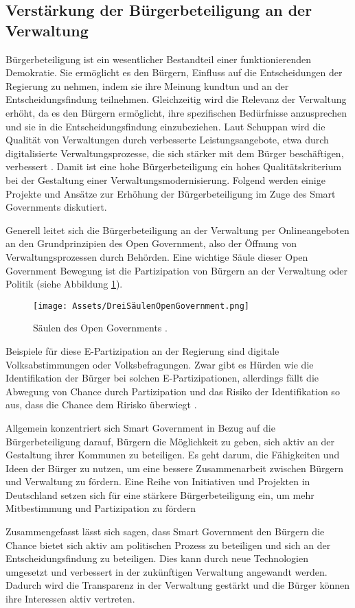 \subsection{Verstärkung der Bürgerbeteiligung an der Verwaltung}
Bürgerbeteiligung ist ein wesentlicher Bestandteil einer funktionierenden Demokratie. 
Sie ermöglicht es den Bürgern, Einfluss auf die Entscheidungen der Regierung zu nehmen, indem sie ihre Meinung kundtun und an der Entscheidungsfindung teilnehmen.
Gleichzeitig wird die Relevanz der Verwaltung erhöht, da es den Bürgern ermöglicht, ihre spezifischen Bedürfnisse anzusprechen und sie in die Entscheidungsfindung einzubeziehen.
Laut Schuppan wird die Qualität von Verwaltungen durch verbesserte Leistungsangebote, etwa durch digitalisierte Verwaltungsprozesse, die sich stärker mit dem Bürger beschäftigen, verbessert \citep[Vgl.][S.35]{Schuppan2016}.
Damit ist eine hohe Bürgerbeteiligung ein hohes Qualitätskriterium bei der Gestaltung einer Verwaltungsmodernisierung.
Folgend werden einige Projekte und Ansätze zur Erhöhung der Bürgerbeteiligung im Zuge des Smart Governments diskutiert.
\par
Generell leitet sich die Bürgerbeteiligung an der Verwaltung per Onlineangeboten an den Grundprinzipien des Open Government, also der Öffnung von Verwaltungsprozessen durch Behörden.
Eine wichtige Säule dieser Open Government Bewegung ist die Partizipation von Bürgern an der Verwaltung oder Politik (siehe Abbildung \ref{fig:DreiSäulenOpenGovernment}).
\begin{figure}[h]
 \centering
 \texttt{[image: Assets/DreiSäulenOpenGovernment.png]}
 \caption{Säulen des Open Governments \citep[][]{Leitner2018}.}
 \label{fig:DreiSäulenOpenGovernment}
\end{figure}
Beispiele für diese E-Partizipation an der Regierung sind digitale Volksabstimmungen oder Volksbefragungen.
Zwar gibt es Hürden wie die Identifikation der Bürger bei solchen E-Partizipationen, allerdings fällt die Abwegung von Chance durch Partizipation und das Risiko der Identifikation so aus, dass die Chance dem Ririsko überwiegt \citep[Vgl.][S.15]{Leitner2018}.
\par
Allgemein konzentriert sich Smart Government in Bezug auf die Bürgerbeteiligung darauf, Bürgern die Möglichkeit zu geben, sich aktiv an der Gestaltung ihrer Kommunen zu beteiligen. 
Es geht darum, die Fähigkeiten und Ideen der Bürger zu nutzen, um eine bessere Zusammenarbeit zwischen Bürgern und Verwaltung zu fördern.  
Eine Reihe von Initiativen und Projekten in Deutschland setzen sich für eine stärkere Bürgerbeteiligung ein, um mehr Mitbestimmung und Partizipation zu fördern \citep[Vgl.][S.18, 49-50]{Leitner2018}
\par 
Zusammengefasst lässt sich sagen, dass Smart Government den Bürgern die Chance bietet sich aktiv am politischen Prozess zu beteiligen und sich an der Entscheidungsfindung zu beteiligen. 
Dies kann durch neue Technologien umgesetzt und verbessert in der zukünftigen Verwaltung angewandt werden.
Dadurch wird die Transparenz in der Verwaltung gestärkt und die Bürger können ihre Interessen aktiv vertreten.